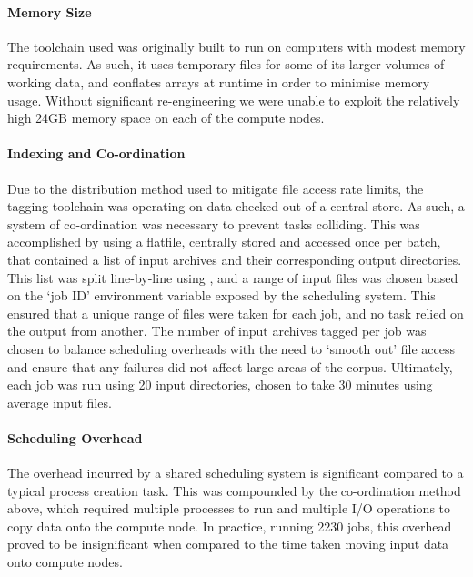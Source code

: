 \paragraph{Memory Size}
The toolchain used was originally built to run on computers with modest memory requirements.  As such, it uses temporary files for some of its larger volumes of working data, and conflates arrays at runtime in order to minimise memory usage.
Without significant re-engineering we were unable to exploit the relatively high 24GB memory space on each of the compute nodes.  





\paragraph{Indexing and Co-ordination}
Due to the distribution method used to mitigate file access rate limits, the tagging toolchain was operating on data checked out of a central store.  As such, a system of co-ordination was necessary to prevent tasks colliding.
This was accomplished by using a flatfile, centrally stored and accessed once per batch, that contained a list of input archives and their corresponding output directories.  This list was split line-by-line using , and a range of input files was chosen based on the `job ID' environment variable exposed by the scheduling system.  This ensured that a unique range of files were taken for each job, and no task relied on the output from another.
The number of input archives tagged per job was chosen to balance scheduling overheads with the need to `smooth out' file access and ensure that any failures did not affect large areas of the corpus.  Ultimately, each job was run using 20 input directories, chosen to take 30 minutes using average input files.



\paragraph{Scheduling Overhead}
The overhead incurred by a shared scheduling system is significant compared to a typical process creation task.  This was compounded by the co-ordination method above, which required multiple processes to run and multiple I/O operations to copy data onto the compute node.
In practice, running 2230 jobs, this overhead proved to be insignificant when compared to the time taken moving input data onto compute nodes.






